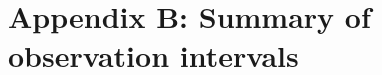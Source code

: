 \chapter{Appendix B: Summary of observation intervals}\label{ch:observation-periods}
\renewcommand{\thechapter}{B}


